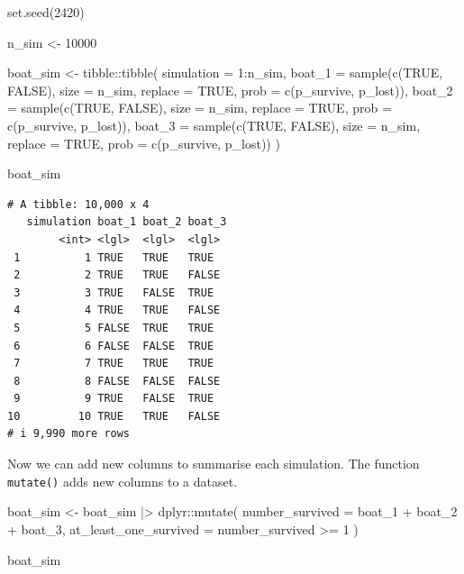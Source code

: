 \documentclass[
  letterpaper,
  DIV=11,
  numbers=noendperiod]{scrreprt}
\newenvironment{Shaded}{\begin{snugshade}}{\end{snugshade}}
\newcommand{\AttributeTok}[1]{\textcolor[rgb]{0.40,0.45,0.13}{#1}}
\newcommand{\ConstantTok}[1]{\textcolor[rgb]{0.56,0.35,0.01}{#1}}
\newcommand{\DecValTok}[1]{\textcolor[rgb]{0.68,0.00,0.00}{#1}}
\newcommand{\FunctionTok}[1]{\textcolor[rgb]{0.28,0.35,0.67}{#1}}
\newcommand{\NormalTok}[1]{\textcolor[rgb]{0.00,0.23,0.31}{#1}}
\newcommand{\OtherTok}[1]{\textcolor[rgb]{0.00,0.23,0.31}{#1}}
\newcommand{\SpecialCharTok}[1]{\textcolor[rgb]{0.37,0.37,0.37}{#1}}
\begin{document}
\begin{Shaded}
\begin{Highlighting}[]
\FunctionTok{set.seed}\NormalTok{(}\DecValTok{2420}\NormalTok{)}

\NormalTok{n\_sim }\OtherTok{\textless{}{-}} \DecValTok{10000}

\NormalTok{boat\_sim }\OtherTok{\textless{}{-}}\NormalTok{ tibble}\SpecialCharTok{::}\FunctionTok{tibble}\NormalTok{(}
  \AttributeTok{simulation =} \DecValTok{1}\SpecialCharTok{:}\NormalTok{n\_sim,}
  \AttributeTok{boat\_1 =} \FunctionTok{sample}\NormalTok{(}\FunctionTok{c}\NormalTok{(}\ConstantTok{TRUE}\NormalTok{, }\ConstantTok{FALSE}\NormalTok{), }\AttributeTok{size =}\NormalTok{ n\_sim, }\AttributeTok{replace =} \ConstantTok{TRUE}\NormalTok{, }\AttributeTok{prob =} \FunctionTok{c}\NormalTok{(p\_survive, p\_lost)),}
  \AttributeTok{boat\_2 =} \FunctionTok{sample}\NormalTok{(}\FunctionTok{c}\NormalTok{(}\ConstantTok{TRUE}\NormalTok{, }\ConstantTok{FALSE}\NormalTok{), }\AttributeTok{size =}\NormalTok{ n\_sim, }\AttributeTok{replace =} \ConstantTok{TRUE}\NormalTok{, }\AttributeTok{prob =} \FunctionTok{c}\NormalTok{(p\_survive, p\_lost)),}
  \AttributeTok{boat\_3 =} \FunctionTok{sample}\NormalTok{(}\FunctionTok{c}\NormalTok{(}\ConstantTok{TRUE}\NormalTok{, }\ConstantTok{FALSE}\NormalTok{), }\AttributeTok{size =}\NormalTok{ n\_sim, }\AttributeTok{replace =} \ConstantTok{TRUE}\NormalTok{, }\AttributeTok{prob =} \FunctionTok{c}\NormalTok{(p\_survive, p\_lost))}
\NormalTok{)}

\NormalTok{boat\_sim}
\end{Highlighting}
\end{Shaded}

\begin{verbatim}
# A tibble: 10,000 x 4
   simulation boat_1 boat_2 boat_3
        <int> <lgl>  <lgl>  <lgl> 
 1          1 TRUE   TRUE   TRUE  
 2          2 TRUE   TRUE   FALSE 
 3          3 TRUE   FALSE  TRUE  
 4          4 TRUE   TRUE   FALSE 
 5          5 FALSE  TRUE   TRUE  
 6          6 FALSE  FALSE  TRUE  
 7          7 TRUE   TRUE   TRUE  
 8          8 FALSE  FALSE  FALSE 
 9          9 TRUE   FALSE  TRUE  
10         10 TRUE   TRUE   FALSE 
# i 9,990 more rows
\end{verbatim}

Now we can add new columns to summarise each simulation. The function
\texttt{mutate()} adds new columns to a dataset.

\begin{Shaded}
\begin{Highlighting}[]
\NormalTok{boat\_sim }\OtherTok{\textless{}{-}}\NormalTok{ boat\_sim }\SpecialCharTok{|\textgreater{}}
\NormalTok{  dplyr}\SpecialCharTok{::}\FunctionTok{mutate}\NormalTok{(}
    \AttributeTok{number\_survived =}\NormalTok{ boat\_1 }\SpecialCharTok{+}\NormalTok{ boat\_2 }\SpecialCharTok{+}\NormalTok{ boat\_3,}
    \AttributeTok{at\_least\_one\_survived =}\NormalTok{ number\_survived }\SpecialCharTok{\textgreater{}=} \DecValTok{1}
\NormalTok{  )}

\NormalTok{boat\_sim}
\end{Highlighting}
\end{Shaded}
\end{document}
